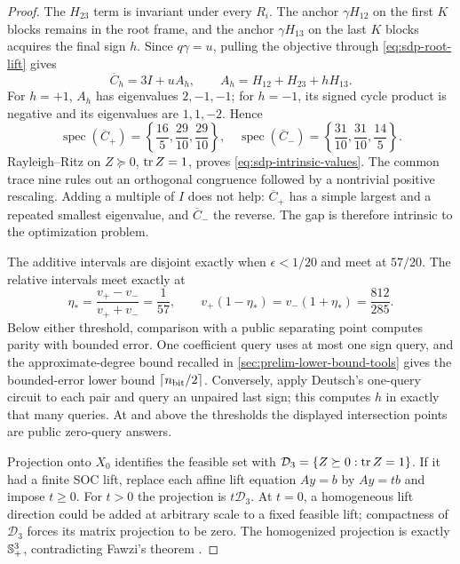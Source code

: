 \begin{proof}
The $H_{23}$ term is invariant under every $R_i$.  The anchor
$\gamma H_{12}$ on the first $K$ blocks remains in the root frame, and the
anchor $\gamma H_{13}$ on the last $K$ blocks acquires the final sign $h$.  Since
$q\gamma=u$, pulling the objective through \eqref{eq:sdp-root-lift} gives
\begin{equation}
 \overline C_h=3I+uA_h,\qquad
 A_h=H_{12}+H_{23}+hH_{13}.                                \label{eq:sdp-effective-cost}
\end{equation}
For $h=+1$, $A_h$ has eigenvalues $2,-1,-1$; for $h=-1$, its signed cycle
product is negative and its eigenvalues are $1,1,-2$.  Hence
\begin{equation}
 \operatorname{spec}(\overline C_+)
 =\left\{\frac{16}5,\frac{29}{10},\frac{29}{10}\right\},
 \quad
 \operatorname{spec}(\overline C_-)
 =\left\{\frac{31}{10},\frac{31}{10},\frac{14}5\right\}.  \label{eq:sdp-intrinsic-spectra}
\end{equation}
Rayleigh--Ritz on $Z\succeq0$, $\operatorname{tr} Z=1$, proves
\eqref{eq:sdp-intrinsic-values}.  The common trace nine rules out an
orthogonal congruence followed by a nontrivial positive rescaling.  Adding a
multiple of $I$ does not help: $\overline C_+$ has a simple largest and a
repeated smallest eigenvalue, and $\overline C_-$ the reverse.  The gap is
therefore intrinsic to the optimization problem.

The additive intervals are disjoint exactly when $\epsilon<1/20$ and meet
at $57/20$.  The relative intervals meet exactly at
\begin{equation}
 \eta_*=\frac{v_+-v_-}{v_++v_-}=\frac1{57},
 \qquad v_+(1-\eta_*)=v_-(1+\eta_*)=\frac{812}{285}.
\end{equation}
Below either threshold, comparison with a public separating point computes
parity with bounded error.  One coefficient query uses at most one sign query,
and the approximate-degree bound recalled in \cref{sec:prelim-lower-bound-tools}
gives the bounded-error lower bound $\lceil n_{\rm bit}/2\rceil$.  Conversely, apply
Deutsch's one-query circuit to each pair and query an unpaired last sign;
this computes $h$ in exactly that many queries.  At and above the thresholds
the displayed intersection points are public zero-query answers.

Projection onto $X_0$ identifies the feasible set with
$\mathcal D_3=\{Z\succeq0:\operatorname{tr} Z=1\}$.  If it had a finite SOC lift, replace
each affine lift equation $Ay=b$ by $Ay=tb$ and impose $t\geq0$.  For $t>0$
the projection is $t\mathcal D_3$.  At $t=0$, a homogeneous lift direction
could be added at arbitrary scale to a fixed feasible lift; compactness of
$\mathcal D_3$ forces its matrix projection to be zero.  The homogenized
projection is exactly $\mathbb{S}_{+}^3$, contradicting Fawzi's theorem
\cite{fawzi2018-on-representing-the-positive-semidefinite}.
\end{proof}

